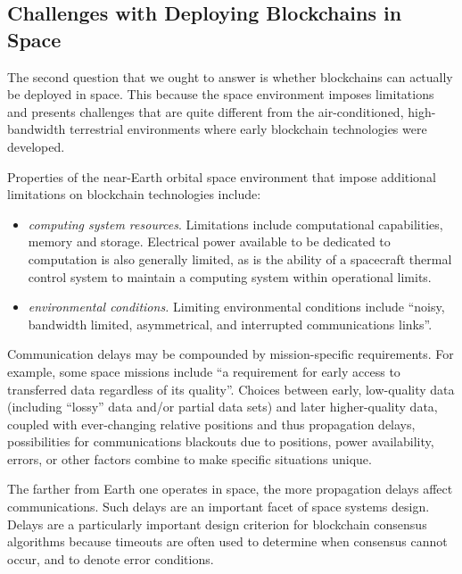 \documentclass[journal ]{new-aiaa}
\begin{document}
\subsection{Challenges with Deploying Blockchains in Space}

The second question that we ought to answer is whether blockchains can actually be deployed in space.
This because the space environment imposes limitations and presents challenges that are quite different from the air-conditioned, high-bandwidth terrestrial environments where early blockchain technologies were developed.

Properties of the near-Earth orbital space environment that impose additional limitations on blockchain technologies include:
\begin{itemize}
\item \textit{computing system resources}. Limitations include computational capabilities, memory\cite{CCSDS_2007} and storage\cite{yu_blockchain_2019}. Electrical power available to be dedicated to computation is also generally limited, as is the ability of a spacecraft thermal control system to maintain a computing system within operational limits.
\item \textit{environmental conditions.} Limiting environmental conditions include ``noisy, bandwidth limited, asymmetrical, and interrupted communications links''\cite{CCSDS_2007}.
\end{itemize}

Communication delays may be compounded by mission-specific requirements. For example, some space missions include ``a requirement for early access to transferred data regardless of its quality''\cite{CCSDS_2007}. Choices between early, low-quality data (including ``lossy'' data and/or partial data sets) and later higher-quality data, coupled with ever-changing relative positions and thus propagation delays, possibilities for communications blackouts due to positions, power availability, errors, or other factors combine to make specific situations unique.

The farther from Earth one operates in space, the more propagation delays affect communications. Such delays are an important facet of space systems design\cite{CCSDS_2007,yu_blockchain_2019}. Delays are a particularly important design criterion for blockchain consensus algorithms because timeouts are often used to determine when consensus cannot occur, and to denote error conditions.
\end{document}

